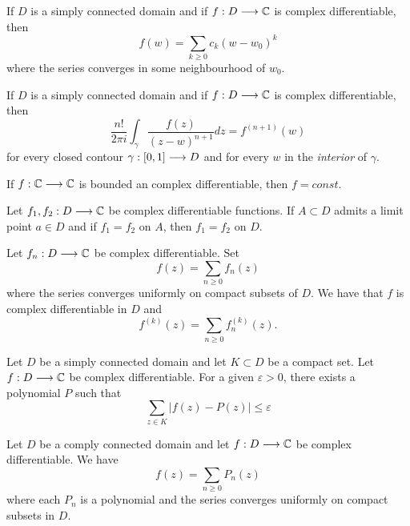 \documentclass{unswmaths}
\begin{document}
\begin{theorem}
    If $ D $ is a simply connected domain and if $ f : D \longrightarrow \mathbb{C} $ is complex differentiable, then
    $$
        f(w) = \sum_{k \geq 0} c_k(w - w_0)^k
    $$
where the series converges in some neighbourhood of $ w_0 $.
\end{theorem}

\begin{corollary}
    If $ D $ is a simply connected domain and if $ f : D \longrightarrow \mathbb{C} $ is complex differentiable, then
    $$
        \frac{n!}{2\pi i} \int_\gamma \frac{f(z)}{(z-w)^{n+1}} dz = f^{(n+1)}(w)
    $$
for every closed contour $ \gamma : [0,1] \longrightarrow D $ and for every $ w $ in the \emph{interior} of $ \gamma $.
\end{corollary}

\begin{theorem}
    If $ f : \mathbb{C} \longrightarrow \mathbb{C} $ is bounded an complex differentiable, then $ f = const $.
\end{theorem}

\begin{theorem}
    Let $ f_1, f_2 : D \longrightarrow \mathbb{C} $ be complex differentiable functions. If $ A \subset D $ admits a limit point $ a \in D $ and if $ f_1 = f_2 $ on $ A $, then $ f_1 = f_2 $ on $ D $.
\end{theorem}

\begin{theorem}
    Let $ f_n : D \longrightarrow \mathbb{C} $ be complex differentiable. Set
    $$
        f(z) = \sum_{n \geq 0} f_n(z)
    $$
    where the series converges uniformly on compact subsets of $ D $. We have that $ f $ is complex differentiable in $ D $ and 
    $$
        f^{(k)}(z) = \sum_{n \geq 0} f_n^{(k)}(z).
    $$
\end{theorem}

\begin{theorem}
    Let $ D $ be a simply connected domain and let $ K \subset D $ be a compact set. Let $ f : D \longrightarrow \mathbb{C} $ be complex differentiable. For a given $ \varepsilon > 0 $, there exists a polynomial $ P $ such that
    $$
        \sum_{z\in K} |f(z) - P(z)| \leq \varepsilon
    $$
\end{theorem}

\begin{theorem}
    Let $ D $ be a comply connected domain and let $ f : D \longrightarrow \mathbb{C} $ be complex differentiable. We have
    $$
        f(z) = \sum_{n \geq 0} P_n(z)
    $$
    where each $ P_n $ is a polynomial and the series converges uniformly on compact subsets in $ D $.
\end{theorem}
\end{document}
